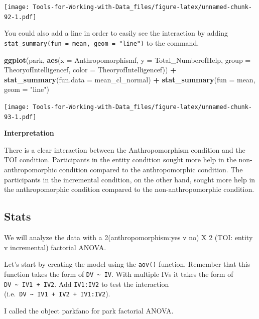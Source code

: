 \documentclass[
]{book}
\newenvironment{Shaded}{\begin{snugshade}}{\end{snugshade}}
\newcommand{\DataTypeTok}[1]{\textcolor[rgb]{0.13,0.29,0.53}{#1}}
\newcommand{\KeywordTok}[1]{\textcolor[rgb]{0.13,0.29,0.53}{\textbf{#1}}}
\newcommand{\NormalTok}[1]{#1}
\newcommand{\OperatorTok}[1]{\textcolor[rgb]{0.81,0.36,0.00}{\textbf{#1}}}
\newcommand{\StringTok}[1]{\textcolor[rgb]{0.31,0.60,0.02}{#1}}
\begin{document}
\texttt{[image: Tools-for-Working-with-Data\_files/figure-latex/unnamed-chunk-92-1.pdf]}

You could also add a line in order to easily see the interaction by adding \texttt{stat\_summary(fun\ =\ mean,\ geom\ =\ "line")} to the command.

\begin{Shaded}
\begin{Highlighting}[]
\KeywordTok{ggplot}\NormalTok{(park, }\KeywordTok{aes}\NormalTok{(}\DataTypeTok{x =}\NormalTok{ Anthropomorphismf, }\DataTypeTok{y =}\NormalTok{ Total_NumberofHelp, }\DataTypeTok{group =}\NormalTok{ TheoryofIntelligencef, }\DataTypeTok{color =}\NormalTok{ TheoryofIntelligencef)) }\OperatorTok{+}
\StringTok{  }\KeywordTok{stat_summary}\NormalTok{(}\DataTypeTok{fun.data =}\NormalTok{ mean_cl_normal) }\OperatorTok{+}
\StringTok{  }\KeywordTok{stat_summary}\NormalTok{(}\DataTypeTok{fun =}\NormalTok{ mean, }\DataTypeTok{geom =} \StringTok{"line"}\NormalTok{)}
\end{Highlighting}
\end{Shaded}

\texttt{[image: Tools-for-Working-with-Data\_files/figure-latex/unnamed-chunk-93-1.pdf]}

\textbf{Interpretation}

There is a clear interaction between the Anthropomorphism condition and the TOI condition. Participants in the entity condition sought more help in the non-anthropomorphic condition compared to the anthropomorphic condition. The participants in the incremental condition, on the other hand, sought more help in the anthropomorphic condition compared to the non-anthropomorphic condition.

\hypertarget{stats-3}{%
\subsection{Stats}\label{stats-3}}

We will analyze the data with a 2(anthropomorphism:yes v no) X 2 (TOI: entity v incremental) factorial ANOVA.

Let's start by creating the model using the \texttt{aov()} function. Remember that this function takes the form of \texttt{DV\ \textasciitilde{}\ IV}. With multiple IVs it takes the form of \texttt{DV\ \textasciitilde{}\ IV1\ +\ IV2}. Add \texttt{IV1:IV2} to test the interaction (i.e.~\texttt{DV\ \textasciitilde{}\ IV1\ +\ IV2\ +\ IV1:IV2}).

I called the object parkfano for park factorial ANOVA.
\end{document}
